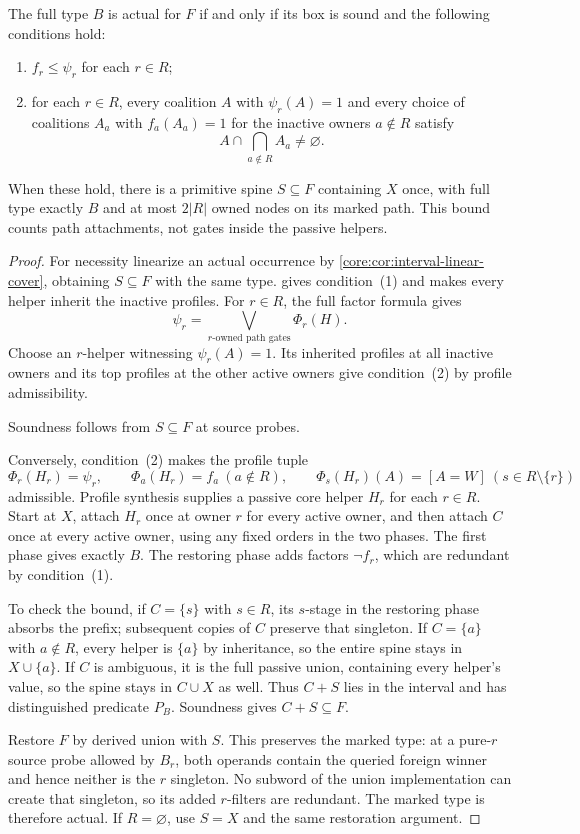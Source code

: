 \begin{theorem}
\label{core:thm:profile-interval-types}
The full type $B$ is actual for $F$ if and only if its box is sound and
the following conditions hold:
\begin{enumerate}
\item $f_r\leq\psi_r$ for each $r\in R$;
\item for each $r\in R$, every coalition $A$ with $\psi_r(A)=1$ and
  every choice of coalitions $A_a$ with $f_a(A_a)=1$ for the inactive
  owners $a\notin R$ satisfy
  \[
   A\cap\bigcap_{a\notin R}A_a\ne\varnothing.
  \]
\end{enumerate}
When these hold, there is a primitive spine $S\subseteq F$ containing
$X$ once, with full type exactly $B$ and at most $2|R|$ owned nodes on
its marked path. This bound counts path attachments, not gates inside
the passive helpers.
\end{theorem}
\begin{proof}
For necessity linearize an actual occurrence by
\cref{core:cor:interval-linear-cover}, obtaining $S\subseteq F$ with
the same type.  gives
condition~(1) and makes every helper inherit the inactive profiles.
For $r\in R$, the full factor formula gives
\[
 \psi_r=\bigvee_{\text{$r$-owned path gates}}\Phi_r(H).
\]
Choose an $r$-helper witnessing $\psi_r(A)=1$. Its inherited profiles
at all inactive owners and its top profiles at the other active owners
give condition~(2) by profile admissibility.

Soundness follows from $S\subseteq F$ at source probes.

Conversely, condition~(2) makes the profile tuple
\[
 \Phi_r(H_r)=\psi_r,\qquad
 \Phi_a(H_r)=f_a\ (a\notin R),\qquad
 \Phi_s(H_r)(A)=[A=W]\ (s\in R\setminus\{r\})
\]
admissible. Profile synthesis supplies a passive core helper $H_r$ for
each $r\in R$. Start at $X$, attach $H_r$ once at owner $r$ for every
active owner, and then attach $C$ once at every active owner, using any
fixed orders in the two phases. The first phase gives exactly $B$.
The restoring phase adds factors $\neg f_r$, which are redundant by
condition~(1).

To check the bound, if $C=\{s\}$ with $s\in R$, its $s$-stage in
the restoring phase absorbs the prefix; subsequent copies of $C$ preserve
that singleton. If $C=\{a\}$ with $a\notin R$, every helper is
$\{a\}$ by inheritance, so the entire spine stays in $X\cup\{a\}$.
If $C$ is ambiguous, it is the full passive union, containing every
helper's value, so the spine stays in $C\cup X$ as well.
Thus $C+S$ lies in the interval and has distinguished predicate $P_B$.
Soundness gives $C+S\subseteq F$.

Restore $F$ by derived union with $S$. This preserves the marked type:
at a pure-$r$ source probe allowed by $B_r$, both operands contain the
queried foreign winner and hence neither is the $r$ singleton. No
subword of the union implementation can create that singleton, so its
added $r$-filters are redundant. The marked type is therefore actual.
If $R=\varnothing$, use $S=X$ and the same restoration argument.
\end{proof}

